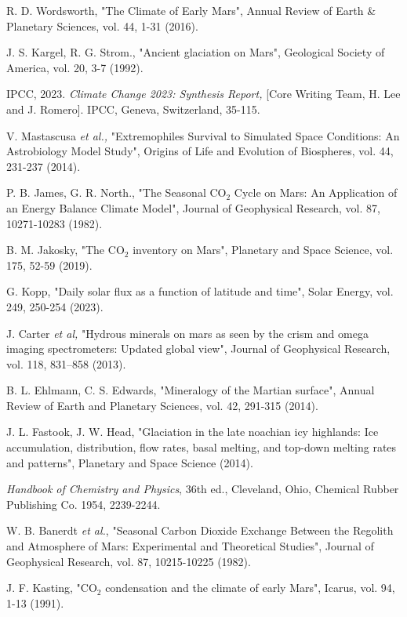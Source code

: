 \documentclass[12pt,onecolumn]{revtex4-2}    %
\begin{document}
\begin{thebibliography}{}
 R. D. Wordsworth, "The Climate of Early Mars", Annual Review of Earth \& Planetary Sciences, vol. 44, 1-31 (2016).

 J. S. Kargel, R. G. Strom., "Ancient glaciation on Mars", Geological Society of America, vol. 20, 3-7 (1992).

 IPCC, 2023. \textit{Climate Change 2023: Synthesis Report,} [Core Writing Team, H. Lee and J. Romero]. IPCC, Geneva, Switzerland, 35-115.

 V. Mastascusa \textit{et al.,} "Extremophiles Survival to Simulated Space Conditions: An Astrobiology Model Study", Origins of Life and Evolution of Biospheres, vol. 44, 231-237 (2014).

 P. B. James, G. R. North., "The Seasonal $\mathrm{CO_2}$ Cycle on Mars: An Application of an Energy Balance Climate Model", Journal of Geophysical Research, vol. 87, 10271-10283 (1982).

 B. M. Jakosky, "The $\mathrm{CO_2}$ inventory on Mars", Planetary and Space Science, vol. 175, 52-59 (2019).

 G. Kopp, "Daily solar flux as a function of latitude and time", Solar Energy, vol. 249, 250-254 (2023).

 J. Carter \textit{et al,} "Hydrous minerals on mars as seen
by the crism and omega imaging spectrometers: Updated global view", Journal of Geophysical
Research, vol. 118, 831–858 (2013).

B. L. Ehlmann, C. S. Edwards, "Mineralogy of the Martian surface", Annual Review of Earth and Planetary Sciences, vol. 42, 291-315 (2014).

 J. L. Fastook, J. W. Head, "Glaciation in the late noachian icy highlands: Ice accumulation,
distribution, flow rates, basal melting, and top-down melting rates and patterns", Planetary and
Space Science (2014).

 \textit{Handbook of Chemistry and Physics}, 36th ed., Cleveland, Ohio, Chemical Rubber Publishing Co. 1954, 2239-2244.

 W. B. Banerdt \textit{et al.}, "Seasonal Carbon Dioxide Exchange Between the Regolith and Atmosphere of Mars: Experimental and Theoretical Studies", Journal of Geophysical Research, vol. 87, 10215-10225 (1982).

 J. F. Kasting, "$\mathrm{CO_2}$ condensation and the climate of early Mars", Icarus, vol. 94, 1-13 (1991).


\end{thebibliography}
\end{document}

